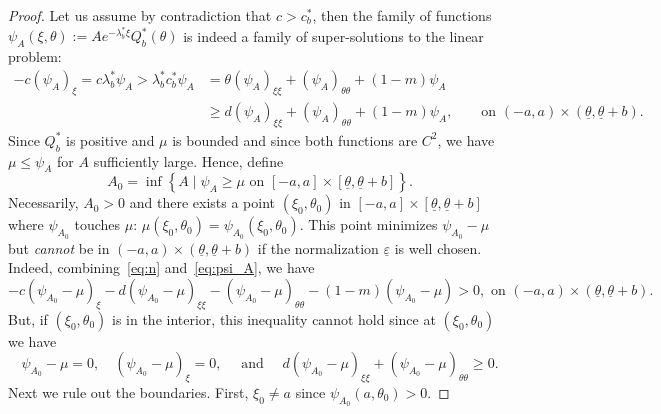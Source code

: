 \documentclass[11pt]{article}    %
\newcommand{\eps}{\varepsilon}
\begin{document}
\begin{proof}
Let us assume by contradiction that $c > c_b^*$, then the family of functions $\psi_A ( \xi, \theta ):= A e^{- \lambda_b^*\xi} Q_b^* ( \theta )$ is indeed a family of super-solutions to the linear problem:
\begin{align}\label{eq:psi_A}
- c \left(\psi_A\right)_{\xi} = c \lambda_b^*\psi_A > \lambda_b^* c_b^* \psi_A &= \theta  \left(\psi_A\right)_{\xi\xi}  + \left(\psi_A\right)_{\theta\theta}  + (1-m )\psi_A \\& \geq d  \left(\psi_A\right)_{\xi\xi}  + \left(\psi_A\right)_{\theta\theta}  + (1-m )\psi_A, \qquad \text{on } (-a,a) \times (\underline\theta, \underline\theta + b) \nonumber.
\end{align}
Since $Q_b^*$ is positive and $\mu$ is bounded and since both functions are $C^2$, we have $\mu \leq \psi_A$ for $A$ sufficiently large.  Hence, define
\begin{equation*}
A_0 = \inf \left\lbrace A \; \vert \; \psi_A \geq \mu \text{ on } [-a,a]\times[\underline\theta, \underline\theta+ b] \right\rbrace. 
\end{equation*}
Necessarily, $A_0 > 0$ and there exists a point $(\xi_0, \theta_0)$ in $[-a,a]\times[\underline\theta, \underline\theta+ b]$ where $\psi_{A_0}$ touches $\mu$: $\mu(\xi_0 , \theta_0) = \psi_{A_0}(\xi_0 , \theta_0).$  This point minimizes $\psi_{A_0} - \mu $ but {\em cannot} be in $(-a,a) \times (\underline\theta, \underline\theta + b)$ if the normalization $\underline\eps$ is well chosen.  Indeed, combining~\eqref{eq:n} and~\eqref{eq:psi_A}, we have
\begin{equation*}
- c \left(\psi_{A_0} - \mu \right)_{\xi} - d \left( \psi_{A_0} - \mu \right)_{\xi\xi} -  \left( \psi_{A_0} - \mu \right)_{\theta\theta} - (1-m) \left( \psi_{A_0} - \mu \right) > 0, \text{ on } (-a,a) \times (\underline\theta, \underline\theta + b).
\end{equation*}
But, if $(\xi_0,\theta_0)$ is in the interior, this inequality cannot hold since at $(\xi_0,\theta_0)$ we  have
\begin{equation*}
	\psi_{A_0} - \mu = 0,
	\quad  \left(\psi_{A_0} - \mu \right)_\xi = 0,
	\quad \text{ and }
	\quad d  \left( \psi_{A_0} - \mu \right)_{\xi\xi} +\left( \psi_{A_0} - \mu \right)_{\theta\theta} \geq 0.
\end{equation*}
Next we rule out the boundaries. First, $\xi_0 \neq a$ since $\psi_{A_0}(a,\theta_0) > 0$.  %

\end{proof}
\end{document}
